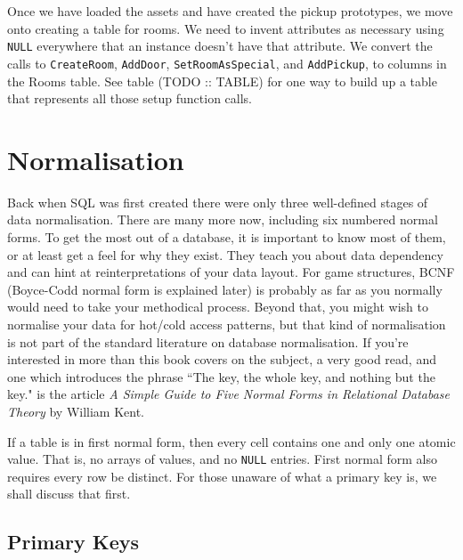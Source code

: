 \documentclass[a4paper,12pt]{book}
\begin{document}
Once we have loaded the assets and have created the pickup prototypes, we move onto creating a table for rooms.
We need to invent attributes as necessary using \texttt{NULL} everywhere that an instance doesn't have that attribute.
We convert the calls to \texttt{CreateRoom}, \texttt{AddDoor}, \texttt{SetRoomAsSpecial}, and \texttt{AddPickup}, to columns in the Rooms table.
See table (TODO :: TABLE) for one way to build up a table that represents all those setup function calls.

\section{Normalisation}

Back when SQL was first created there were only three well-defined stages of data normalisation.
There are many more now, including six numbered normal forms.
To get the most out of a database, it is important to know most of them, or at least get a feel for why they exist.
They teach you about data dependency and can hint at reinterpretations of your data layout.
For game structures, BCNF (Boyce-Codd normal form is explained later) is probably as far as you normally would need to take your methodical process.
Beyond that, you might wish to normalise your data for hot/cold access patterns, but that kind of normalisation is not part of the standard literature on database normalisation.
If you're interested in more than this book covers on the subject, a very good read, and one which introduces the phrase ``The key, the whole key, and nothing but the key." is the article \textit{A Simple Guide to Five Normal Forms in Relational Database Theory} by William Kent.

If a table is in first normal form, then every cell contains one and only one atomic value.
That is, no arrays of values, and no \texttt{NULL} entries.
First normal form also requires every row be distinct.
For those unaware of what a primary key is, we shall discuss that first.

\subsection{Primary Keys}
\end{document}
